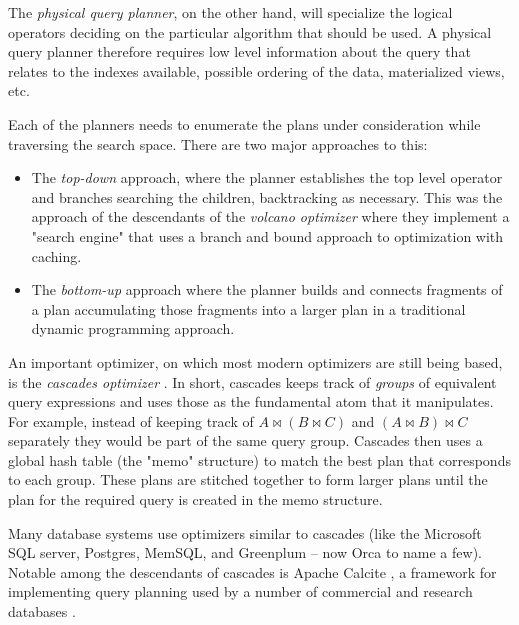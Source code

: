 The \emph{physical query planner}, on the other hand, will specialize
the logical operators deciding on the particular algorithm that should
be used. A physical query planner therefore requires low level
information about the query that relates to the indexes available,
possible ordering of the data, materialized views, etc.

Each of the planners needs to enumerate the plans under
consideration while traversing the search space. There are two major
approaches to this:

\begin{itemize}
\item The \emph{top-down} approach, where the planner establishes the
  top level operator and branches searching the children, backtracking
  as necessary. This was the approach of the descendants of the
  \emph{volcano optimizer} \cite{graefeVolcanoOptimizerGenerator1993a}
  where they implement a "search engine" that uses a branch and bound
  approach to optimization with caching.
\item The \emph{bottom-up} approach where the planner builds and
  connects fragments of a plan accumulating those fragments into a
  larger plan in a traditional dynamic programming approach.
  \cite{raasveldtDuckdbEmbeddableAnalytical2019,kemperHyPerHybridOLTP2011}
\end{itemize}

An important optimizer, on which most modern optimizers are still
being based, is the \emph{cascades optimizer}
\cite{graefeCascadesFrameworkQuery1995}. In short, cascades keeps
track of \emph{groups} of equivalent query expressions and uses those
as the fundamental atom that it manipulates. For example, instead of
keeping track of \(A \Join (B \Join C)\) and \((A \Join B) \Join C\)
separately they would be part of the same query group. Cascades then uses a
global hash table (the "memo" structure) to match the best plan that
corresponds to each group. These plans are stitched together to form larger
plans until the plan for the required query is created in the memo structure.

Many database systems use optimizers similar to cascades (like the
Microsoft SQL server, Postgres,
MemSQL\cite{chenMemSQLQueryOptimizer2016}, and Greenplum -- now Orca
\cite{solimanOrcaModularQuery2014a} to name a few). Notable among the
descendants of cascades is Apache Calcite
\cite{begoliApacheCalciteFoundational2018}, a framework for
implementing query planning used by a number of commercial and
research databases \cite{nunesalonsoBuildingPolyglotData2020}.

